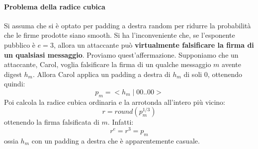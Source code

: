 \paragraph{Problema della radice cubica}
Si assuma che si è optato per padding a destra random per ridurre la probabilità che le firme prodotte siano smooth. Si ha l'inconveniente che, se l'esponente pubblico è $e = 3$, allora un attaccante può \textbf{virtualmente falsificare la firma di un qualsiasi messaggio}. Proviamo quest'affermazione.
\newline \newline
Supponiamo che un attaccante, Carol, voglia falsificare la firma di un qualche messaggio $m$ avente digest $h_{m}$. Allora Carol applica un padding a destra di $h_{m}$ di soli 0, ottenendo quindi:
\begin{equation}
p_{m} = <h_{m} \mid 00..00>
\end{equation}
Poi calcola la radice cubica ordinaria e la arrotonda all'intero più vicino:
\begin{equation}
r = round(p_{m}^{1/3})
\end{equation} 
ottenendo la firma falsificata di $m$. Infatti:
\begin{equation}
r^e = r^3 = p_{m}
\end{equation} 
ossia $h_{m}$ con un padding a destra che è apparentemente casuale.


